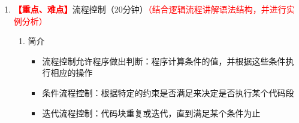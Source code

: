 \documentclass{TIJMUjiaoanLL}
\begin{document}
\begin{enumerate}
\begin{enumerate}
\begin{multicols}{2}
\begin{enumerate}
\begin{itemize}
	      \item 多行注释的每行开头都要有\#
	      \item 行中间可以插入\#添加注释
	    \end{itemize}
	  \item 注释内容
	    \begin{itemize}
	      \item 脚本的基本信息
	      \item 脚本的修改日志
	      \item 脚本每个部分的作用
	      \item 由用户添加的数据
	    \end{itemize}
	\end{enumerate}
	\end{multicols}
	\vspace*{-10pt}
      \item 变量使用
	\begin{itemize}
	  \item 赋值：使用=（赋值运算符），=两边不能有空格，在=后面跟一个换行符赋空值
	  \item 访问：默认情况下将变量视作文本字符串，在变量名前加\$可以访问变量的值 
	  \item 变量名：只能包含字母、数字和下划线，必须以字母或下划线开头，大小写敏感（惯例使用大写）
	\end{itemize}
      \item 从键盘读取输入：使用read读取键盘输入并为变量赋值
      \item 特殊变量
      \item 退出状态：0表示成功，1表示不成功
    \end{enumerate}

  \item
    \textcolor{red}{\textbf{【重点、难点】}}流程控制（20分钟）\textcolor{red}{（结合逻辑流程讲解语法结构，并进行实例分析）}
    \begin{enumerate}
      \item 简介
	\begin{itemize}
	  \item 流程控制允许程序做出判断：程序计算条件的值，并根据这些条件执行相应的操作
          \item 条件流程控制：根据特定的约束是否满足来决定是否执行某个代码段
          \item 迭代流程控制：代码块重复或迭代，直到满足某个条件为止
	\end{itemize}


\end{enumerate}
\end{enumerate}
\end{document}
